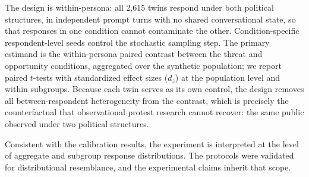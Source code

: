 The design is within-persona: all 2{,}615 twins respond under both
political structures, in independent prompt turns with no shared
conversational state, so that responses in one condition cannot contaminate
the other. Condition-specific respondent-level seeds control the stochastic
sampling step. The primary estimand is the within-persona paired contrast
between the threat and opportunity conditions, aggregated over the
synthetic population; we report paired $t$-tests with standardized effect
sizes ($d_z$) at the population level and within subgroups. Because each
twin serves as its own control, the design removes all between-respondent
heterogeneity from the contrast, which is precisely the counterfactual that
observational protest research cannot recover: the same public observed
under two political structures.

Consistent with the calibration results, the experiment is interpreted at
the level of aggregate and subgroup response distributions. The protocols
were validated for distributional resemblance, and the experimental claims
inherit that scope.
